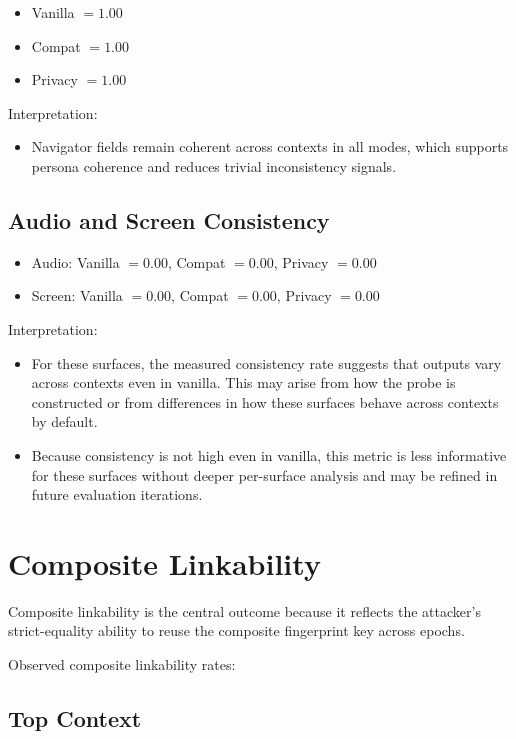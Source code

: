 \documentclass[11pt]{report}
\begin{document}
\begin{itemize}
    \item Vanilla $=1.00$
    \item Compat $=1.00$
    \item Privacy $=1.00$
\end{itemize}

Interpretation:
\begin{itemize}
    \item Navigator fields remain coherent across contexts in all modes, which supports persona coherence and reduces trivial inconsistency signals.
\end{itemize}

\subsection{Audio and Screen Consistency}

\begin{itemize}
    \item Audio: Vanilla $=0.00$, Compat $=0.00$, Privacy $=0.00$
    \item Screen: Vanilla $=0.00$, Compat $=0.00$, Privacy $=0.00$
\end{itemize}

Interpretation:
\begin{itemize}
    \item For these surfaces, the measured consistency rate suggests that outputs vary across contexts even in vanilla. This may arise from how the probe is constructed or from differences in how these surfaces behave across contexts by default.
    \item Because consistency is not high even in vanilla, this metric is less informative for these surfaces without deeper per-surface analysis and may be refined in future evaluation iterations.
\end{itemize}

\section{Composite Linkability}

Composite linkability is the central outcome because it reflects the attacker’s strict-equality ability to reuse the composite fingerprint key across epochs.

Observed composite linkability rates:

\subsection{Top Context}
\end{document}
